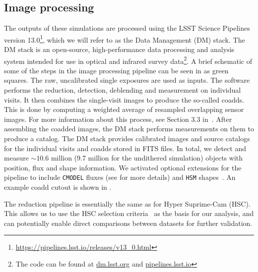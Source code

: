 \documentclass[\docopts]{\docclass}
\begin{document}
\subsection{Image processing}
\label{sec:image_processing_pipeline}

The outputs of these simulations are processed using the LSST Science Pipelines~\citep{Overview,ScienceBook,WhitePaper,2015arXiv151207914J,2018PASJ...70S...5B} version 13.0\footnote{\url{https://pipelines.lsst.io/releases/v13_0.html}}, which we will refer to as the Data Management (DM) stack. The DM stack is an open-source, high-performance data processing and analysis system intended for use in optical and infrared survey data\footnote{The code can be found at \url{dm.lsst.org} and \url{pipelines.lsst.io}}. A brief schematic of some of the steps in the image processing pipeline can be seen in  as green squares. The raw, uncalibrated single exposures are used as inputs. The software performs the reduction, detection, deblending and measurement on individual visits. It then combines the single-visit images to produce the so-called coadds. This is done by computing a weighted average of resampled overlapping sensor images. For more information about this process, see Section 3.3 in~\citet{2018PASJ...70S...5B}. After assembling the coadded images, the DM stack performs measurements on them to produce a catalog. The DM stack provides calibrated images and source catalogs for the individual visits and coadds stored in FITS files. In total, we detect and measure $\sim 10.6$ million  (9.7 million for the undithered simulation) objects with position, flux and shape information. We activated optional extensions for the pipeline to include \texttt{CMODEL} fluxes (see \citealt{2018PASJ...70S...5B} for more details) and \texttt{HSM} shapes~\citep{2003MNRAS.343..459H,2005MNRAS.361.1287M}. An example coadd cutout is shown in .

The reduction pipeline is essentially the same as for Hyper Suprime-Cam (HSC). This allows us to use the HSC selection criteria~\citep[Sec. 5.1]{2018PASJ...70S..25M} as the basis for our analysis, and can potentially enable direct comparisons between datasets for further validation.
\end{document}
